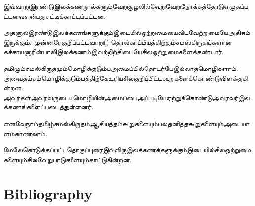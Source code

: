 இவ்வாறுஇரண்டுஇலக்கணநூல்களும்வேறுசூழலில்வேறுவேறுநோக்கத்தோடுஎழுதப்பட்டவைஎன்பதுசுட்டிக்காட்டப்பட்டன.

அதனால்இரண்டுஇலக்கணங்களுக்கும்இடையில்ஒற்றுமையைவிடவேற்றுமையேஅதிகம்இருக்கும். முன்னரேகுறிப்பட்டவாறு() தொல்காப்பியத்திற்கும்சமஸ்கிருதங்களான  கச்சாயனாரின்பாலிஇலக்கணம்இவற்றிற்கிடையேசிலஒற்றுமைகளைக்கண்டார்.

தமிழும்சமஸ்கிருதமும்மொழிக்குடும்பஅமைப்பில்தொடர்பேஇல்லாதமொழிகளாம். அவைதம்தம்மொழிக்குடும்பத்திற்கேஉரியசிலகுறிப்பிட்டகூறுகளைக்கொண்டுவிளக்குகின்றன. அவர்கள்அவரவருடையமொழியின்அமைப்பைஅப்படியேஏற்றுக்கொண்டுஅவரவர்இலக்கணங்களைப்படைத்துள்ளனர். 

எனவேநாம்தமிழ்சமஸ்கிருதம்ஆகியத்தம்கூறுகளையும்பலதனித்தகூறுகளையும்அடையாளம்காணலாம். 

மேலேகொடுக்கப்பட்டதொகுப்புரைஇவ்விருஇலக்கணக்களுக்கும்இடையில்சிலஒற்றுமைகளையும்சிலவேறுபாடுகளையும்காட்டுகின்றன.


\section*{Bibliography}

